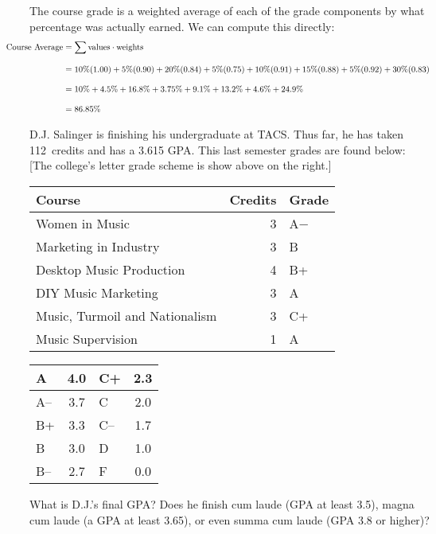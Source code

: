 \documentclass[11pt,letterpaper]{article}
\begin{document}
\sol The course grade is a weighted average of each of the grade components by what percentage was actually earned. We can compute this directly: 
	\[
	\begin{aligned}
	\hspace{-1cm}\text{Course Average}&= \sum \text{values} \cdot \text{weights} \\[0.3cm]
	&= 10\% (1.00) + 5\% (0.90) + 20\% (0.84) + 5\% (0.75) + 10\% (0.91) + 15\% (0.88) + 5\% (0.92) + 30\% (0.83) \\[0.3cm]
	&= 10\% + 4.5\% + 16.8\% + 3.75\% + 9.1\% + 13.2\% + 4.6\% + 24.9\% \\[0.3cm]
	&= 86.85\% 
	\end{aligned}
	\]



\newpage



 D.J. Salinger is finishing his undergraduate at TACS. Thus far, he has taken 112~credits and has a 3.615 GPA. This last semester grades are found below: [The college's letter grade scheme is show above on the right.] \par
	\begin{table}[!ht]
	\centering
	\begin{tabular}{lrl}
	Course & Credits & Grade \\ \hline
	Women in Music & 3 & A$-$ \\
	Marketing in Industry & 3 & B \\
	Desktop Music Production & 4 & B+ \\
	DIY Music Marketing & 3 & A \\
	Music, Turmoil and Nationalism & 3 & C+ \\
	Music Supervision & 1 & A
	\end{tabular} \hspace{1cm}
        \begin{tabular}{|l||c|l||c|} \hline
        A & 4.0 & C+ & 2.3 \\ \hline
        A-- & 3.7 & C & 2.0 \\ \hline
        B+ & 3.3 & C-- & 1.7 \\ \hline
        B & 3.0 & D & 1.0 \\ \hline
        B-- & 2.7 & F & 0.0 \\ \hline
        \end{tabular}
	\end{table} \par
What is D.J.'s final GPA? Does he finish cum laude (GPA at least 3.5), magna cum laude (a GPA at least 3.65), or even summa cum laude (GPA 3.8 or higher)? \pspace
\end{document}
